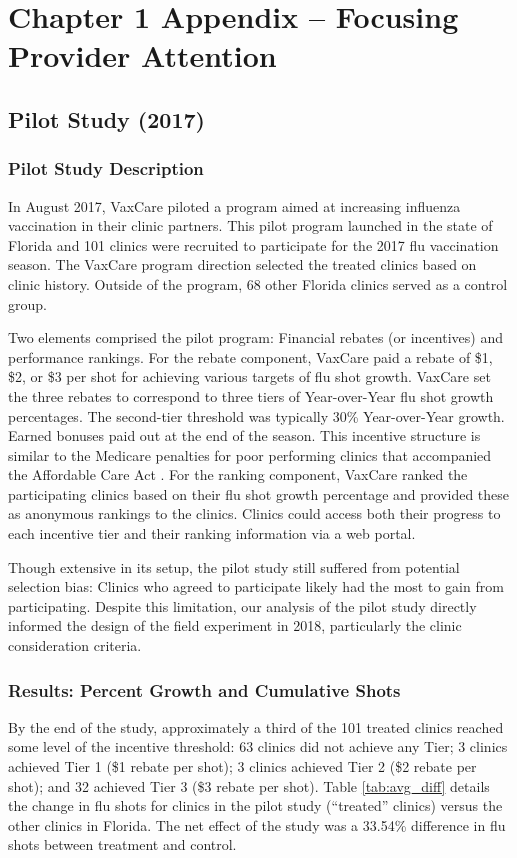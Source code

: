 \chapter{Chapter 1 Appendix -- Focusing Provider Attention} \label{app_cc}

\section{Pilot Study (2017)} \label{app_cc_pilot}
\subsection{Pilot Study Description}
In August 2017, VaxCare piloted a program aimed at increasing influenza vaccination in their clinic partners. This pilot program launched in the state of Florida and 101 clinics were recruited to participate for the 2017 flu vaccination season. The VaxCare program direction selected the treated clinics based on clinic history. Outside of the program, 68 other Florida clinics served as a control group. 

Two elements comprised the pilot program: Financial rebates (or incentives) and performance rankings. For the rebate component, VaxCare paid a rebate of \$1, \$2, or \$3 per shot for achieving various targets of flu shot growth. VaxCare set the three rebates to correspond to three tiers of Year-over-Year flu shot growth percentages. The second-tier threshold was typically 30\% Year-over-Year growth. Earned bonuses paid out at the end of the season. This incentive structure is similar to the Medicare penalties for poor performing clinics that accompanied the Affordable Care Act \citep[see][for discussion]{Zhang2016}. For the ranking component, VaxCare ranked the participating clinics based on their flu shot growth percentage and provided these as anonymous rankings to the clinics. Clinics could access both their progress to each incentive tier and their ranking information via a web portal.

Though extensive in its setup, the pilot study still suffered from potential selection bias: Clinics who agreed to participate likely had the most to gain from participating. Despite this limitation, our analysis of the pilot study directly informed the design of the field experiment in 2018, particularly the clinic consideration criteria. 

\subsection{Results: Percent Growth and Cumulative Shots}
By the end of the study, approximately a third of the 101 treated clinics reached some level of the incentive threshold: 63 clinics did not achieve any Tier; 3 clinics achieved Tier 1 (\$1 rebate per shot); 3 clinics achieved Tier 2 (\$2 rebate per shot); and 32 achieved Tier 3 (\$3 rebate per shot). Table \ref{tab:avg_diff} details the change in flu shots for clinics in the pilot study (“treated” clinics) versus the other clinics in Florida. The net effect of the study was a 33.54\% difference in flu shots between treatment and control. 

